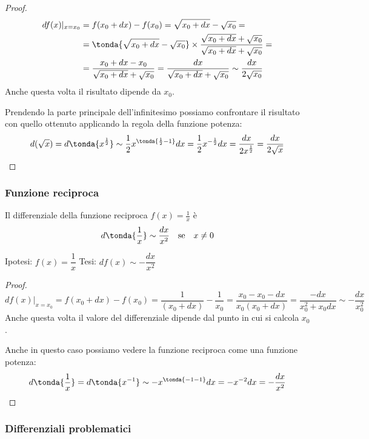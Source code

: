 \begin{proof}
\begin{align*}
 df(x)|_{x=x_0} &= f(x_0+dx)-f(x_0)=\sqrt{x_0+dx}-\sqrt{x_0}=\\
 &=\tonda{\sqrt{x_0+dx}-\sqrt{x_0}}\times\frac{\sqrt{x_0+dx}+
 \sqrt{x_0}}{\sqrt{x_0+dx}+\sqrt{x_0}}=\\
 &=\frac{x_0+dx-x_0}{\sqrt{x_0+dx}+\sqrt{x_0}}
 =\frac{dx}{\sqrt{x_0+dx}+\sqrt{x_0}}\sim\frac{dx}{2\sqrt{x_0}}
\end{align*}
Anche questa volta il risultato dipende da $x_0$. 

Prendendo la parte principale dell'infinitesimo possiamo confrontare il 
risultato con quello ottenuto applicando la regola della funzione potenza:
\[d(\sqrt{x}) = d\tonda{x^{\frac{1}{2}}}
  \sim\frac{1}{2}x^{\tonda{\frac{1}{2}-1}}dx 
  =\frac{1}{2}x^{-\frac{1}{2}}dx
  =\frac{dx}{2x^{\frac{1}{2}}}
  =\frac{dx}{2\sqrt{x}}\]

\end{proof}

\subsubsection{Funzione reciproca}
\label{subsubsec:diff01_diffrecip}
\begin{teorema}
 Il differenziale della funzione reciproca $f(x)=\frac{1}{x}$ è 
 \[d\tonda{\frac{1}{x}}\sim\frac{dx}{x^2} \quad \text{se} \quad x \neq 0\]
\end{teorema}

\noindent Ipotesi: $f(x)=\dfrac{1}{x}$\tab 
Tesi: $df(x)\sim-\dfrac{dx}{x^2}$

\begin{proof}
\[
 df(x)|_{x=x_0}= f(x_0+dx)-f(x_0)=\frac{1}{(x_0+dx)}-\frac{1}{x_0}=
 \frac{x_0-x_0-dx}{x_0(x_0+dx)}=\frac{-dx}{x_0^2+x_0dx}\sim-\frac{dx}{x_0^2}
\]
Anche questa volta il valore del differenziale dipende dal punto in cui si 
calcola $x_0$. 

Anche in questo caso possiamo vedere la funzione reciproca come una 
funzione potenza:
\[d\tonda{\frac{1}{x}} = d\tonda{x^{-1}}
  \sim -x^{\tonda{-1-1}}dx 
  =-x^{-2}dx
  =-\frac{dx}{x^{2}}\]

\end{proof}

\subsubsection{Differenziali problematici}
\label{subsubsec:diff01_diffproblemi}

